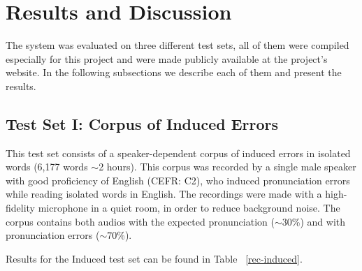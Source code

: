\documentclass[twocolumn]{bmcart}%
\begin{document}
\section{Results and Discussion}\label{results}

The system was evaluated on three different test sets, all of them were compiled especially for this project and were made publicly available at the project's website. In the following subsections we describe each of them and present the results.

\subsection{Test Set I: Corpus of Induced Errors}
This test set consists of a speaker-dependent corpus of induced errors in isolated words (6,177 words $\sim$2 hours). This corpus was recorded by a single male speaker with good proficiency of English (CEFR: C2), who induced pronunciation errors while reading isolated words in English. The recordings were made with a high-fidelity microphone in a quiet room, in order to reduce background noise. The corpus contains both audios with the expected pronunciation ($\sim$30\%) and with pronunciation errors ($\sim$70\%).

Results for the Induced test set can be found in Table ~\ref{rec-induced}.
\end{document}
